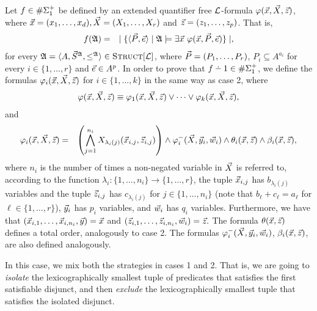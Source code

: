 Let $f \in \E1$ be defined by an extended quantifier free $\L$-formula $\varphi(\x,\X,\z)$, where $\x = (x_1,\dots,x_d), \X = (X_1,\dots,X_r)$ and $\z = (z_1,\dots,z_p)$. That is,
\begin{eqnarray*}
f(\A) &=& \mid \{ \langle\P,\e\rangle \mid \A \models \exists \x \ \varphi(\x,\P,\e) \} \mid,
\end{eqnarray*}
for every $\A = \langle A, \S^{\A}, \leq^{\A} \rangle \in \Truc$, where $\P = (P_1,\ldots,P_r)$, $P_i \subseteq A^{a_i}$ for every $i \in \{1,\ldots,r\}$ and $\e \in A^p$. In order to prove that $f\dotminus 1\in\E1$, we define the formulas $\varphi_i(\x,\X,\z)$ for $i\in\{1,\ldots,k\}$ in the same way as case 2, where
\begin{eqnarray*}
\varphi(\x,\X,\z) \equiv \varphi_1(\x,\X,\z) \vee \cdots \vee \varphi_k(\x,\X,\z),
\end{eqnarray*}
and
\begin{eqnarray*}
\varphi_i(\x,\X,\z) &=& \left( \bigwedge_{j=1}^{n_i} X_{\lambda_i(j)}(\x_{i,j},\z_{i,j}) \right) \wedge \varphi^{-}_i(\X,\y_i,\w_i) \wedge \theta_i(\x,\z) \wedge \beta_i(\x,\z),
\end{eqnarray*}
where $n_i$ is the number of times a non-negated variable in $\X$ is referred to, according to the function $\lambda_i:\{1,\ldots,n_i\}\to\{1,\ldots,r\}$, the tuple $\x_{i,j}$ has $b_{\lambda_i(j)}$ variables and the tuple $\z_{i,j}$ has $c_{\lambda_i(j)}$ for $j\in\{1,\ldots,n_i\}$ (note that $b_{\ell} + c_{\ell} = a_{\ell}$ for $\ell\in\{1,\ldots,r\}$), $\y_i$ has $p_i$ variables, and $\w_i$ has $q_i$ variables. Furthermore, we have that $(\x_{i,1},\ldots,\x_{i,n_i},\y) = \x$ and $(\z_{i,1},\ldots,\z_{i,n_i},\w_i) = \z.$ The formula $\theta(\x,\z)$ defines a total order, analogously to case 2. The formulas $\varphi^{-}_i(\X,\y_i,\w_i)$, $\beta_i(\x,\z)$, are also defined analogously.

In this case, we mix both the strategies in cases 1 and 2. That is, we are going to {\em isolate} the lexicographically smallest tuple of predicates that satisfies the first satisfiable disjunct, and then {\em exclude} the lexicographically smallest tuple that satisfies the isolated disjunct.

